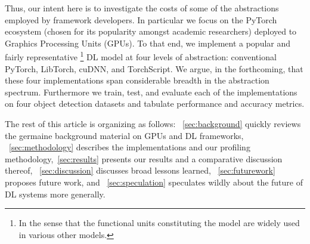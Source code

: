 Thus, our intent here is to investigate the costs of some of the abstractions employed by framework developers.
In particular we focus on the PyTorch ecosystem (chosen for its popularity amongst academic researchers) deployed to Graphics Processing Units (GPUs).
To that end, we implement a popular and fairly representative%
\footnote{In the sense that the functional units constituting the model are widely used in various other models.}
DL model at four levels of abstraction: conventional PyTorch, LibTorch, cuDNN, and TorchScript.
We argue, in the forthcoming, that these four implementations span considerable breadth in the abstraction spectrum.
Furthermore we train, test, and evaluate each of the implementations on four object detection datasets and tabulate performance and accuracy metrics.

The rest of this article is organizing as follows: ~\cref{sec:background} quickly reviews the germaine background material on GPUs and DL frameworks, ~\cref{sec:methodology} describes the implementations and our profiling methodology,~\cref{sec:results} presents our results and a comparative discussion thereof, ~\cref{sec:discussion} discusses broad lessons learned, ~\cref{sec:futurework} proposes future work, and ~\cref{sec:speculation} speculates wildly about the future of DL systems more generally.

